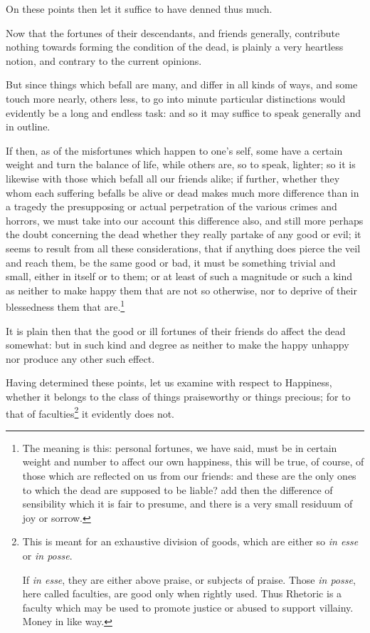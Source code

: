On these points then let it suffice to have denned thus much.


Now that the fortunes of their descendants, and friends generally, contribute
nothing towards forming the condition of the dead, is plainly a very heartless
notion, and contrary to the current opinions.

But since things which befall are many, and differ in all kinds of ways, and
some touch more nearly, others less, to go into minute particular distinctions
would evidently be a long and endless task: and so it may suffice to speak
generally and in outline.

If then, as of the misfortunes which happen to one’s self, some have a
certain weight and turn the balance of life, while others are, so to speak,
lighter; so it is likewise with those which befall all our friends alike; if
further, whether they whom each suffering befalls be alive or dead makes much
more difference than in a tragedy the presupposing or actual perpetration of
the various crimes and horrors, we must take into our account this difference
also, and still more perhaps the doubt concerning the dead whether they really
partake of any good or evil; it seems to result from all these considerations,
that if anything does pierce the veil and reach them, be the same good or bad,
it must be something trivial and small, either in itself or to them; or at
least of such a magnitude or such a kind as neither to make happy them that are
not so otherwise, nor to deprive of their blessedness them that
are.\footnote{The meaning is this: personal fortunes, we have said, must be in certain weight
and number to affect our own happiness, this will be true, of course, of those
which are reflected on us from our friends: and these are the only ones to
which the dead are supposed to be liable? add then the difference of
sensibility which it is fair to presume, and there is a very small residuum of
joy or sorrow.}

It is plain then that the good or ill fortunes of their friends do affect the
dead somewhat: but in such kind and degree as neither to make the happy unhappy
nor produce any other such effect.


Having determined these points, let us examine with respect to Happiness,
whether it belongs to the class of things praiseworthy or things precious; for
to that of faculties\footnote{This is meant for an exhaustive division of goods, which are either so \emph{in
esse} or \emph{in posse}.

If \emph{in esse}, they are either above praise, or subjects of praise.
Those \emph{in posse}, here called faculties, are good only when rightly used.
Thus Rhetoric is a faculty which may be used to promote justice or abused to
support villainy. Money in like way.}
it evidently does not.

